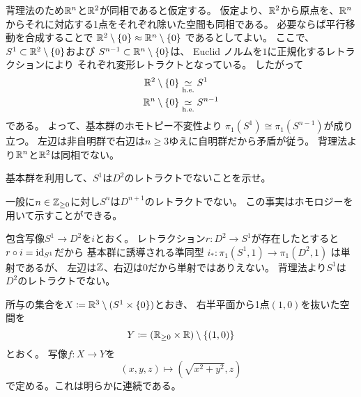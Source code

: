 \documentclass[report]{jlreq}
\begin{document}
\begin{answer}
    背理法のため$\mathbb{R}^n$と$\mathbb{R}^2$が同相であると仮定する。
    仮定より、$\mathbb{R}^2$から原点を、$\mathbb{R}^n$からそれに対応する1点をそれぞれ除いた空間も同相である。
    必要ならば平行移動を合成することで
    $\mathbb{R}^2 \setminus \{ 0 \} \approx \mathbb{R}^n \setminus \{ 0 \}$
    であるとしてよい。
    ここで、$S^1 \subset \mathbb{R}^2 \setminus \{ 0 \}$および
    $S^{n - 1} \subset \mathbb{R}^n \setminus \{ 0 \}$は、
    Euclid ノルムを$1$に正規化するレトラクションにより
    それぞれ変形レトラクトとなっている。
    したがって
    \begin{alignat}{1}
        \R^2 \setminus \{ 0 \} &\simeqhe S^1 \\
        \R^n \setminus \{ 0 \} &\simeqhe S^{n - 1}
    \end{alignat}
    である。
    よって、基本群のホモトピー不変性より
    $\pi_1(S^1) \cong \pi_1(S^{n - 1})$が成り立つ。
    左辺は非自明群で右辺は$n \ge 3$ゆえに自明群だから矛盾が従う。
    背理法より$\mathbb{R}^n$と$\mathbb{R}^2$は同相でない。
\end{answer}

\begin{problem}[幾何学II 4.5]
    基本群を利用して、$S^1$は$D^2$のレトラクトでないことを示せ。
\end{problem}

\begin{remark}
    一般に$n \in \mathbb{Z}_{\ge 0}$に対し$S^n$は$D^{n + 1}$のレトラクトでない。
    この事実はホモロジーを用いて示すことができる。
\end{remark}

\begin{answer}
    包含写像$S^1 \to D^2$を$i$とおく。
    レトラクション$r \colon D^2 \to S^1$が存在したとすると
    $r \circ i = \mathrm{id}_{S^1}$だから
    基本群に誘導される準同型
    $i_* \colon \pi_1(S^1, 1) \to \pi_1(D^2, 1)$
    は単射であるが、
    左辺は$\mathbb{Z}$、右辺は$0$だから単射ではありえない。
    背理法より$S^1$は$D^2$のレトラクトでない。
\end{answer}


\begin{answer}
    所与の集合を$X \coloneqq \mathbb{R}^3 \setminus (S^1 \times \{ 0 \})$とおき、
    右半平面から1点$(1, 0)$を抜いた空間を
    \begin{equation}
        Y \coloneqq (\mathbb{R}_{\ge 0} \times \mathbb{R}) \setminus \{ (1, 0) \}
    \end{equation}
    とおく。
    写像$f \colon X \to Y$を
    \begin{equation}
        (x, y, z) \mapsto (\sqrt{x^2 + y^2}, z)
    \end{equation}
    で定める。これは明らかに連続である。
\end{answer}
\end{document}

